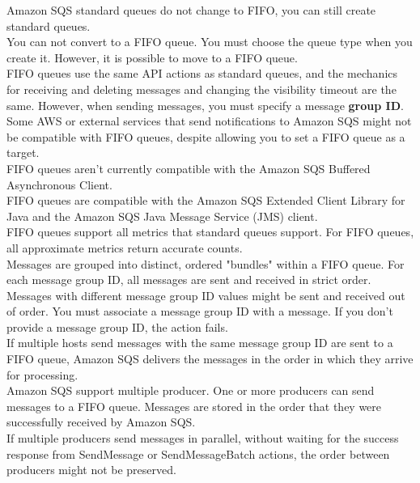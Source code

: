 \documentclass[12pt, letterpaper, twoside]{article}
\begin{document}
Amazon SQS standard queues do not change to FIFO, you can still create standard queues.\\

You can not convert to a FIFO queue. You must choose the queue type when you create it. However, it 
is possible to move to a FIFO queue.\\

FIFO queues use the same API actions as standard queues, and the mechanics for receiving and deleting messages and 
changing the visibility timeout are the same. However, when sending messages, you must specify a message \textbf{group ID}.\\

Some AWS or external services that send notifications to Amazon SQS might not be compatible with FIFO queues, 
despite allowing you to set a FIFO queue as a target.\\

FIFO queues aren't currently compatible with the Amazon SQS Buffered Asynchronous Client.\\
FIFO queues are compatible with the Amazon SQS Extended Client Library for Java and the Amazon SQS Java 
Message Service (JMS) client.\\

FIFO queues support all metrics that standard queues support. For FIFO queues, all approximate metrics return accurate 
counts.\\

Messages are grouped into distinct, ordered "bundles" within a FIFO queue. For each message group ID, all messages are sent 
and received in strict order. Messages with different message group ID values might be sent and received out of order. 
You must associate a message group ID with a message. If you don't provide a message group ID, the action fails.\\
If multiple hosts send messages with the same message group ID are sent to a FIFO queue, Amazon SQS delivers the 
messages in the order in which they arrive for processing.\\

Amazon SQS support multiple producer. One or more producers can send messages to a FIFO queue. 
Messages are stored in the order that they were successfully received by Amazon SQS.\\
If multiple producers send messages in parallel, without waiting for the success response from SendMessage or 
SendMessageBatch actions, the order between producers might not be preserved.\\
\end{document}
